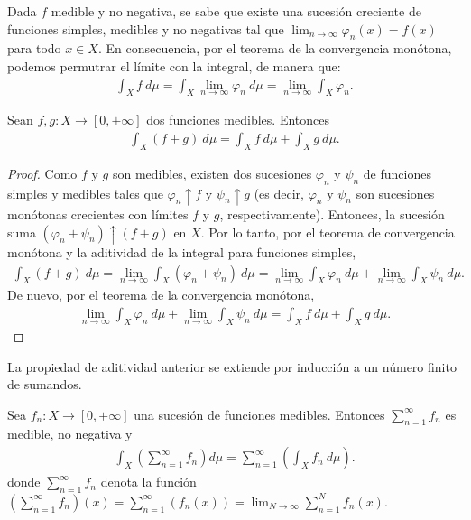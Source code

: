 \begin{obs}
    Dada $f$ medible y no negativa, se sabe que existe una sucesión creciente de funciones simples, medibles y no negativas tal que $\lim_{n \to \infty}{\varphi_n(x) = f(x)}$ para todo $x \in X$. En consecuencia, por el teorema de la convergencia monótona, podemos permutrar el límite con la integral, de manera que:
    \begin{align*}
        \int_{X}{f \ d\mu} = \int_{X}{\lim_{n \to \infty}{\varphi_n} \ d\mu} = \lim_{n \to \infty}{\int_{X}{\varphi_n}}.
    \end{align*}
\end{obs}
\begin{prop}
    Sean $f,g: X \longrightarrow [0,+\infty]$ dos funciones medibles. Entonces
    \begin{align*}
        \int_{X}{(f+g) \ d\mu} = \int_{X}{f \ d\mu} + \int_{X}{g \ d\mu}.
    \end{align*}
\end{prop}

\begin{proof}
    Como $f$ y $g$ son medibles, existen dos sucesiones $\varphi_n$ y $\psi_n$ de funciones simples y medibles tales que $\varphi_n \uparrow f$ y $\psi_n \uparrow g$ (es decir, $\varphi_n$ y $\psi_n$ son sucesiones monótonas crecientes con límites $f$ y $g$, respectivamente). Entonces, la sucesión suma $(\varphi_n + \psi_n) \uparrow (f+g)$ en $X$. Por lo tanto, por el teorema de convergencia monótona y la aditividad de la integral para funciones simples,
    \begin{align*}
        \int_{X}{(f+g) \ d\mu} = \lim_{n \to \infty}{\int_{X}{(\varphi_n + \psi_n)} \ d\mu} = \lim_{n \to \infty}{\int_{X}{\varphi_n} \ d\mu} + \lim_{n \to \infty}{\int_{X}{\psi_n} \ d\mu}.
    \end{align*}
    De nuevo, por el teorema de la convergencia monótona,
    \begin{align*}
        \lim_{n \to \infty}{\int_{X}{\varphi_n} \ d\mu} + \lim_{n \to \infty}{\int_{X}{\psi_n} \ d\mu} = \int_{X}{f \ d\mu} + \int_{X}{g \ d\mu}.
    \end{align*}
\end{proof}

\begin{obs}
    La propiedad de aditividad anterior se extiende por inducción a un número finito de sumandos.
\end{obs}

\begin{prop}
    \label{prop:limin}
    Sea $f_n: X \to [0,+\infty]$ una sucesión de funciones medibles. Entonces $\sum_{n=1}^{\infty}{f_n}$ es medible, no negativa y
    \begin{align*}
        \int_{X} \left( {\sum_{n=1}^{\infty}{f_n}} \right) d\mu = \sum_{n=1}^{\infty}{\left( \int_{X}{f_n \ d\mu} \right)}.
    \end{align*}
    donde $\sum_{n=1}^{\infty}{f_n}$ denota la función $\left(\sum_{n=1}^{\infty}{f_n}\right)(x) = \sum_{n=1}^{\infty}{(f_n(x))} = \lim_{N \to \infty}{\sum_{n=1}^{N}{f_n(x)}}$.
\end{prop}

